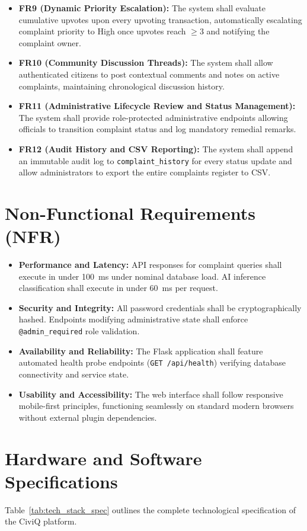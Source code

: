 \documentclass[12pt,a4paper]{report}
\begin{document}
\begin{itemize}
    \item \textbf{FR9 (Dynamic Priority Escalation):} The system shall evaluate cumulative upvotes upon every upvoting transaction, automatically escalating complaint priority to High once upvotes reach $\ge 3$ and notifying the complaint owner.
    \item \textbf{FR10 (Community Discussion Threads):} The system shall allow authenticated citizens to post contextual comments and notes on active complaints, maintaining chronological discussion history.
    \item \textbf{FR11 (Administrative Lifecycle Review and Status Management):} The system shall provide role-protected administrative endpoints allowing officials to transition complaint status and log mandatory remedial remarks.
    \item \textbf{FR12 (Audit History and CSV Reporting):} The system shall append an immutable audit log to \texttt{complaint\_history} for every status update and allow administrators to export the entire complaints register to CSV.
\end{itemize}

\section{Non-Functional Requirements (NFR)}
\begin{itemize}
    \item \textbf{Performance and Latency:} API responses for complaint queries shall execute in under 100~ms under nominal database load. AI inference classification shall execute in under 60~ms per request.
    \item \textbf{Security and Integrity:} All password credentials shall be cryptographically hashed. Endpoints modifying administrative state shall enforce \texttt{@admin\_required} role validation.
    \item \textbf{Availability and Reliability:} The Flask application shall feature automated health probe endpoints (\texttt{GET /api/health}) verifying database connectivity and service state.
    \item \textbf{Usability and Accessibility:} The web interface shall follow responsive mobile-first principles, functioning seamlessly on standard modern browsers without external plugin dependencies.
\end{itemize}

\section{Hardware and Software Specifications}
Table~\ref{tab:tech_stack_spec} outlines the complete technological specification of the CiviQ platform.
\end{document}
